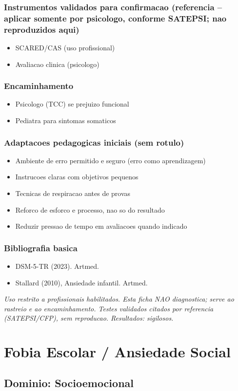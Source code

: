 \documentclass[a4paper,11pt]{book}
\newcommand{\avisolegal}{\par\medskip\noindent\footnotesize\itshape
\color{cinza}Uso restrito a profissionais habilitados. Esta ficha NAO diagnostica;
serve ao rastreio e ao encaminhamento. Testes validados citados por referencia
(SATEPSI/CFP), sem reproducao. Resultados: sigilosos.\color{black}\par}
\begin{document}
\subsection*{Instrumentos validados para confirmacao (referencia -- aplicar somente por psicologo, conforme SATEPSI; nao reproduzidos aqui)}
\begin{itemize}
\item SCARED/CAS (uso profissional)
\item Avaliacao clinica (psicologo)
\end{itemize}
\subsection*{Encaminhamento}
\begin{itemize}
\item Psicologo (TCC) se prejuizo funcional
\item Pediatra para sintomas somaticos
\end{itemize}
\subsection*{Adaptacoes pedagogicas iniciais (sem rotulo)}
\begin{itemize}
\item Ambiente de erro permitido e seguro (erro como aprendizagem)
\item Instrucoes claras com objetivos pequenos
\item Tecnicas de respiracao antes de provas
\item Reforco de esforco e processo, nao so do resultado
\item Reduzir pressao de tempo em avaliacoes quando indicado
\end{itemize}
\subsection*{Bibliografia basica}
\begin{itemize}
\item DSM-5-TR (2023). Artmed.
\item Stallard (2010), Ansiedade infantil. Artmed.
\end{itemize}
\avisolegal


\chapter{Fobia Escolar / Ansiedade Social}
\section*{Dominio: Socioemocional}
\end{document}
